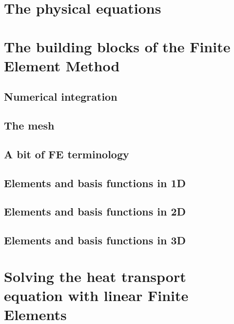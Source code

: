 \documentclass[a4paper]{article}
\begin{document}
\section{The physical equations} %

\newpage
\section{The building blocks of the Finite Element Method} %
\subsection{Numerical integration} \label{sec:quadrature} %
\subsection{The mesh}
\subsection{A bit of FE terminology}  %
\subsection{Elements and basis functions in 1D}\label{sec:elts1D}  %
\subsection{Elements and basis functions in 2D}\label{sec:shpfct2d}  %
\subsection{Elements and basis functions in 3D}  %


\newpage 
\section{Solving the heat transport equation with linear Finite Elements} %
\end{document}
